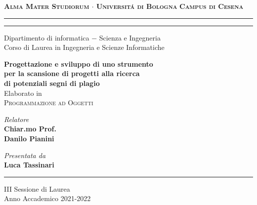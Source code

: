 \begin{titlepage}
    \begin{center}
        {\Large
            \textbf{
                \textsc{Alma Mater Studiorum $\cdot$ Universit\'a di Bologna}
            }
        }
        {\large
            \textbf{
                \textsc{Campus di Cesena}
            }
        }
        \rule[0.1cm]{16cm}{0.1mm}
        \rule[0.5cm]{16cm}{0.6mm}
        {\Large
                Dipartimento di informatica $-$ Scienza e Ingegneria \\
        }
        \vspace*{4mm}
        {\Large 
            Corso di Laurea in Ingegneria e Scienze Informatiche
        }
        \vspace*{30mm}
        \begin{center}
            {\LARGE
                \textbf{
                    Progettazione e sviluppo di uno strumento \\
                    per la scansione di progetti alla ricerca \\
                    di potenziali segni di plagio
                }
            } \\
            \vspace*{15mm}
            {\Large
                Elaborato in 
            } \\
            \vspace*{3mm}
            {\Large
                \textsc{Programmazione ad Oggetti}
            }
        \end{center}
        \vspace*{45mm}
        \begin{minipage}[t]{0.47\textwidth}
            {\large
                \textit{Relatore} \\
                \textbf{
                    Chiar.mo Prof.\\
                    Danilo Pianini
                }
            }
        \end{minipage}
        \begin{minipage}[t]{0.47\textwidth}\raggedleft
            {\large
                \textit{Presentata da} \\
                \textbf{Luca Tassinari}
            }
        \end{minipage}
    \end{center}
    \begin{center}
        \vspace*{30mm}
        \rule[0.1cm]{16cm}{0.1mm}  
    \end{center}
    \begin{center}
        {\large
            III Sessione di Laurea
        } \\
        \vspace*{2mm}
        {\large
            Anno Accademico 2021-2022
        }
    \end{center}
\end{titlepage}
\restoregeometry